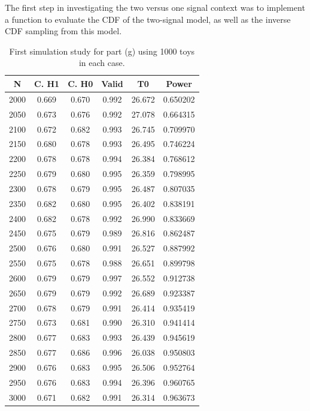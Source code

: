 \documentclass[12pt]{article}
\begin{document}
The first step in investigating the two versus one signal context was to implement a function to evaluate the CDF of the two-signal model, as well as the inverse CDF sampling from this model.

\begin{table}
  \centering
  \begin{tabular}{| c | c | c | c | c | c |}
      \hline
         N & C. H1 & C. H0 & Valid & T0     & Power    \\
      \hline
      2000 & 0.669 & 0.670 & 0.992 & 26.672 & 0.650202 \\
      \hline
      2050 & 0.673 & 0.676 & 0.992 & 27.078 & 0.664315 \\
      \hline
      2100 & 0.672 & 0.682 & 0.993 & 26.745 & 0.709970 \\
      \hline
      2150 & 0.680 & 0.678 & 0.993 & 26.495 & 0.746224 \\
      \hline
      2200 & 0.678 & 0.678 & 0.994 & 26.384 & 0.768612 \\
      \hline
      2250 & 0.679 & 0.680 & 0.995 & 26.359 & 0.798995 \\
      \hline
      2300 & 0.678 & 0.679 & 0.995 & 26.487 & 0.807035 \\
      \hline
      2350 & 0.682 & 0.680 & 0.995 & 26.402 & 0.838191 \\
      \hline
      2400 & 0.682 & 0.678 & 0.992 & 26.990 & 0.833669 \\
      \hline
      2450 & 0.675 & 0.679 & 0.989 & 26.816 & 0.862487 \\
      \hline
      2500 & 0.676 & 0.680 & 0.991 & 26.527 & 0.887992 \\
      \hline
      2550 & 0.675 & 0.678 & 0.988 & 26.651 & 0.899798 \\
      \hline
      2600 & 0.679 & 0.679 & 0.997 & 26.552 & 0.912738 \\
      \hline
      2650 & 0.679 & 0.679 & 0.992 & 26.689 & 0.923387 \\
      \hline
      2700 & 0.678 & 0.679 & 0.991 & 26.414 & 0.935419 \\
      \hline
      2750 & 0.673 & 0.681 & 0.990 & 26.310 & 0.941414 \\
      \hline
      2800 & 0.677 & 0.683 & 0.993 & 26.439 & 0.945619 \\
      \hline
      2850 & 0.677 & 0.686 & 0.996 & 26.038 & 0.950803 \\
      \hline
      2900 & 0.676 & 0.683 & 0.995 & 26.506 & 0.952764 \\
      \hline
      2950 & 0.676 & 0.683 & 0.994 & 26.396 & 0.960765 \\
      \hline
      3000 & 0.671 & 0.682 & 0.991 & 26.314 & 0.963673 \\
      \hline
  \end{tabular}
\caption{First simulation study for part (g) using 1000 toys in each case.}
\label{tab_g_1}
\end{table}
\end{document}
